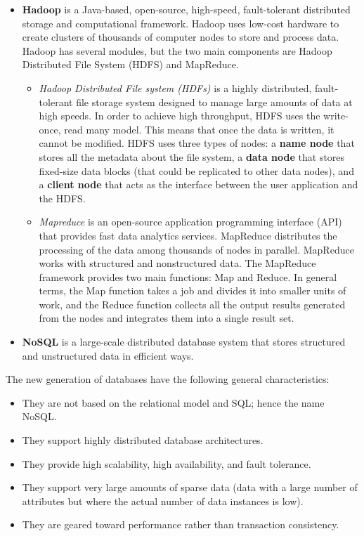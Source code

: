 \documentclass[a4paper, 12pt, titlepage]{report}
\begin{document}
\begin{itemize}
\item \textbf{Hadoop} is a Java-based, open-source, high-speed, fault-tolerant distributed storage and computational framework. Hadoop uses low-cost hardware to create clusters of thousands of computer nodes to store and process data. Hadoop has several modules, but the two main components are Hadoop Distributed File System (HDFS) and MapReduce.
\begin{itemize}
\item \emph{Hadoop Distributed File system (HDFs)} is a highly distributed, fault-tolerant file storage system designed to manage large amounts of data at high speeds. In order to achieve high throughput, HDFS uses the write-once, read many model. This means that once the data is written, it cannot be modified. HDFS uses three types of nodes: a \textbf{name node} that stores all the metadata about the file system, a \textbf{data node} that stores fixed-size data blocks (that could be replicated to other data nodes), and a \textbf{client node} that acts as the interface between the user application and the HDFS.
\item \emph{Mapreduce} is an open-source application programming interface (API) that provides fast data analytics services. MapReduce distributes the processing of the data among thousands of nodes in parallel. MapReduce works with structured and nonstructured data. The MapReduce framework provides two main functions: Map and Reduce. In general terms, the Map function takes a job and divides it into smaller units of work, and the Reduce function collects all the output results generated from the nodes and integrates them into a single result set.
\end{itemize}
\item \textbf{NoSQL} is a large-scale distributed database system that stores structured and unstructured data in efficient ways.
\end{itemize}
The new generation of databases have the following general characteristics:
\begin{itemize}
\item They are not based on the relational model and SQL; hence the name NoSQL.
\item They support highly distributed database architectures.
\item They provide high scalability, high availability, and fault tolerance.
\item They support very large amounts of sparse data (data with a large number of attributes but where the actual number of data instances is low).
\item They are geared toward performance rather than transaction consistency.
\end{itemize}
\end{document}
